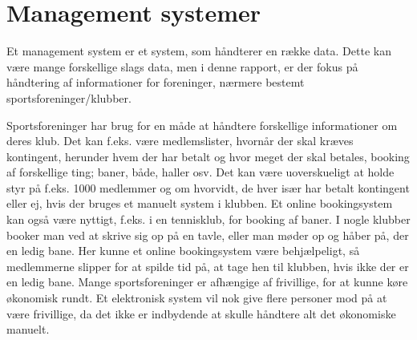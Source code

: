 \chapter{Management systemer}\label{chap:management-systemer}

\cbstart

Et management system er et system, som håndterer en række data. Dette kan være mange forskellige slags data, men i denne
rapport, er der fokus på håndtering af informationer for foreninger, nærmere bestemt sportsforeninger/klubber.

Sportsforeninger har brug for en måde at håndtere forskellige informationer om deres klub. Det kan f.eks. være
medlemslister, hvornår der skal kræves kontingent, herunder hvem der har betalt og hvor meget der skal betales, booking
af forskellige ting; baner, både, haller osv. Det kan være uoverskueligt at holde styr på f.eks. 1000 medlemmer og om
hvorvidt, de hver især har betalt kontingent eller ej, hvis der bruges et manuelt system i klubben. Et online
bookingsystem kan også være nyttigt, f.eks. i en tennisklub, for booking af baner. I nogle klubber booker man ved at
skrive sig op på en tavle, eller man møder op og håber på, der en ledig bane. Her kunne et online bookingsystem være
behjælpeligt, så medlemmerne slipper for at spilde tid på, at tage hen til klubben, hvis ikke der er en ledig bane.
\newline
Mange sportsforeninger er afhængige af frivillige, for at kunne køre økonomisk rundt. Et
elektronisk system vil nok give flere personer mod på at være frivillige, da det ikke er indbydende at skulle håndtere
alt det økonomiske manuelt.


\cbend
